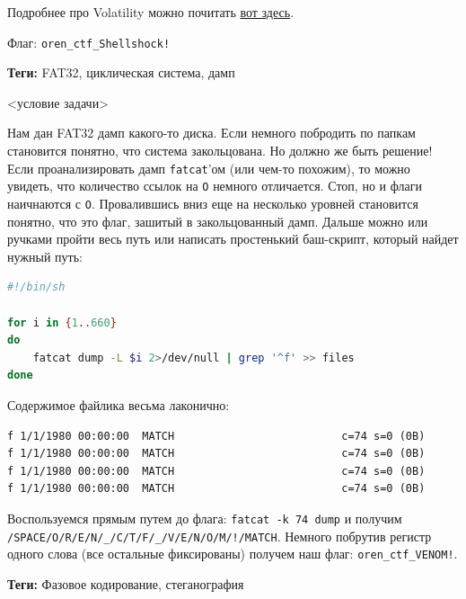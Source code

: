 \documentclass[idxtotoc,hyperref,openany,oneside]{files/forensics} %
\begin{document}
Подробнее про Volatility можно почитать \href{https://habr.com/ru/post/433248/}{вот здесь}.

Флаг: \verb|oren_ctf_Shellshock!|




\textbf{Теги:} FAT32, циклическая система, дамп\vspace{\baselineskip}

\begin{tcolorbox}
<условие задачи>
\end{tcolorbox}

Нам дан FAT32 дамп какого-то диска. Если немного побродить по папкам становится понятно, что система закольцована. Но должно же быть решение! Если проанализировать дамп \verb|fatcat|'ом (или чем-то похожим), то можно увидеть, что количество ссылок на \verb|O| немного отличается. Стоп, но и флаги наичнаются с \verb|O|. Провалившись вниз еще на несколько уровней становится понятно, что это флаг, зашитый в закольцованный дамп. Дальше можно или ручками пройти весь путь или написать простенький баш-скрипт, который найдет нужный путь:
\begin{lstlisting}[language=Bash]
#!/bin/sh

for i in {1..660}
do
    fatcat dump -L $i 2>/dev/null | grep '^f' >> files
done
\end{lstlisting}

Содержимое файлика весьма лаконично:
\begin{lstlisting}
f 1/1/1980 00:00:00  MATCH                          c=74 s=0 (0B)
f 1/1/1980 00:00:00  MATCH                          c=74 s=0 (0B)
f 1/1/1980 00:00:00  MATCH                          c=74 s=0 (0B)
f 1/1/1980 00:00:00  MATCH                          c=74 s=0 (0B)
\end{lstlisting}

Воспользуемся прямым путем до флага: \verb|fatcat -k 74 dump| и получим \newline \verb|/SPACE/O/R/E/N/_/C/T/F/_/V/E/N/O/M/!/MATCH|. Немного побрутив регистр одного слова (все остальные фиксированы) получем наш флаг: \verb|oren_ctf_VENOM!|.
\newpage



\textbf{Теги:} Фазовое кодирование, стеганография\vspace{\baselineskip}
\end{document}
